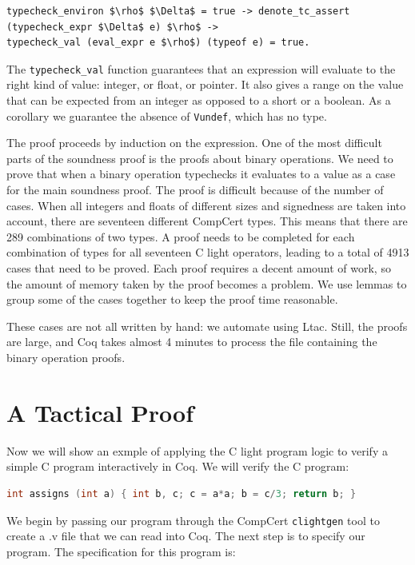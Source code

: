 \documentclass{puthesis}
\begin{document}
\begin{lstlisting}
typecheck_environ $\rho$ $\Delta$ = true -> denote_tc_assert (typecheck_expr $\Delta$ e) $\rho$ ->
typecheck_val (eval_expr e $\rho$) (typeof e) = true.
\end{lstlisting} 

The \lstinline|typecheck_val| function guarantees that an expression
will evaluate to the right kind of value: integer, or float, or
pointer. It also gives a range on the value that can be expected from
an integer as opposed to a short or a boolean.  As a corollary we
guarantee the absence of \lstinline|Vundef|, which has no type.

The proof proceeds by induction on the expression.  One of the most
difficult parts of the soundness proof is the proofs about binary
operations. We need to prove that when a binary operation typechecks
it evaluates to a value as a case for the main soundness proof. The
proof is difficult because of the number of cases. When all integers
and floats of different sizes and signedness are taken into account,
there are seventeen different CompCert types. This means that there
are 289 combinations of two types. A proof needs to be completed for
each combination of types for all seventeen C light operators, leading
to a total of 4913 cases that need to be proved.  Each proof requires
a decent amount of work, so the amount of memory taken by the proof
becomes a problem. We use lemmas to group some of the cases together
to keep the proof time reasonable.

These cases are not all written by hand: we automate using Ltac.
Still, the proofs are large, and Coq takes almost 4 minutes to process
the file containing the binary operation proofs.


\section{A Tactical Proof}
\label{sec:example}
Now we will show an exmple of applying the C light program logic to verify a simple C program
interactively in Coq. We will verify the C program: 

\begin{lstlisting}[language=c]
int assigns (int a) { int b, c; c = a*a; b = c/3; return b; }
\end{lstlisting}

We begin by passing our program through the CompCert \lstinline|clightgen| tool
to create a .v file that we can read into Coq. The next step is to specify our program. The
specification for this program is:
\end{document}
